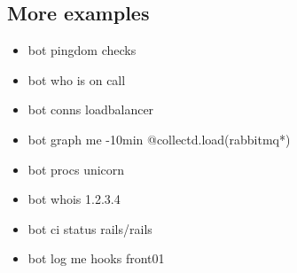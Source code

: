 \documentclass[
paper=128mm:96mm, %
fontsize=11pt, %
pagesize, %
parskip=half-, %
]{scrartcl} %
\theoremstyle{mythmstyle} %
\newtheorem{theorem}{Theorem}[section] %
\newcommand*{\mybox}[2]{ %
\par\noindent
\begin{tikzpicture}[mynodestyle/.style={rectangle,draw=mygreen,thick,inner sep=2mm,text justified,top color=white,bottom color=white,above}]\node[mynodestyle,at={(0.5*#1+2mm+0.4pt,0)}]{ %
\begin{minipage}[t]{#1}
#2
\end{minipage}
};
\end{tikzpicture}
\par\vspace{-1.3em}}
\begin{document}

\subsection{More examples}
\begin{itemize}
\item bot pingdom checks
\item bot who is on call
\item bot conns loadbalancer
\item bot graph me -10min @collectd.load(rabbitmq*)
\item bot procs unicorn
\item bot whois 1.2.3.4
\item bot ci status rails/rails
\item bot log me hooks front01
\end{itemize}

\clearpage










\end{document}
